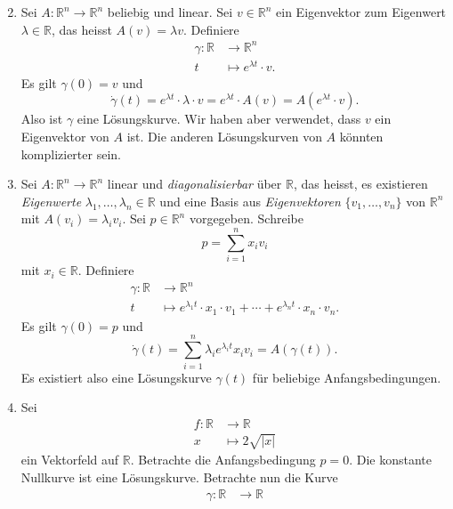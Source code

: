 \documentclass[../main.tex]{subfiles}
\begin{document}
\begin{examples}
\begin{enumerate}[(1)]
\[      \]
    \item Sei $A \colon \mathbb{R}^n \to \mathbb{R}^n$ 
      beliebig und linear.
      Sei $v \in \mathbb{R}^n$ ein Eigenvektor zum Eigenwert
      $\lambda \in \mathbb{R}$, das heisst
      $A(v) = \lambda v$.
      Definiere
       \begin{align*}
        \gamma \colon \mathbb{R} & \to \mathbb{R}^n \\
        t & \mapsto e^{\lambda t} \cdot v.
      \end{align*}
      Es gilt $\gamma(0) = v$ und
      \[
        \dot \gamma(t) = e^{\lambda t} \cdot \lambda \cdot v
        = e^{\lambda t}  \cdot A(v)
        = A(e^{\lambda t} \cdot v).
      \]
      Also ist $\gamma$ eine Lösungskurve.
      Wir haben aber verwendet, dass $v$ ein Eigenvektor
      von $A$ ist. Die anderen Lösungskurven von $A$ 
      könnten komplizierter sein.
    \item Sei $A \colon \mathbb{R}^n \to \mathbb{R}^n$ 
      linear und \emph{diagonalisierbar} über $\mathbb{R}$,
      das heisst, es existieren
      \emph{Eigenwerte} $\lambda_1, \dots, \lambda_n \in \mathbb{R}$ 
      und eine Basis aus \emph{Eigenvektoren}
      $\{v_1, \dots, v_n\}$ von $\mathbb{R}^n$ 
      mit $A(v_i) = \lambda_i v_i$.
      Sei $p \in \mathbb{R}^n$ vorgegeben. Schreibe
      \[
        p = \sum_{i=1}^{n} x_i v_i
      \]
      mit $x_i \in \mathbb{R}$.
      Definiere
      \begin{align*}
        \gamma \colon \mathbb{R} & \to \mathbb{R}^n \\
        t & \mapsto e^{\lambda_1 t} \cdot x_1 \cdot v_1 +
        \cdots
        +
        e^{\lambda_n t} \cdot x_n \cdot v_n.
      \end{align*}
      Es gilt $\gamma(0) = p$ und
      \[
        \dot \gamma(t) = \sum_{i=1}^{n} \lambda_i e^{\lambda_i t}x_i v_i
        = A(\gamma(t)).
      \]
      Es existiert also eine Lösungskurve $\gamma(t)$ 
      für beliebige Anfangsbedingungen.
    \item Sei
      \begin{align*}
        f \colon \mathbb{R} & \to \mathbb{R} \\
        x & \mapsto 2 \sqrt{|x|}
      \end{align*}
      ein Vektorfeld auf $\mathbb{R}$.
      Betrachte die Anfangsbedingung $p = 0$.
      Die konstante Nullkurve ist
      eine Lösungskurve.
      Betrachte nun die Kurve
      \begin{align*}
        \gamma \colon \mathbb{R} & \to \mathbb{R} \\

\end{align*}
\end{enumerate}
\end{examples}
\end{document}
